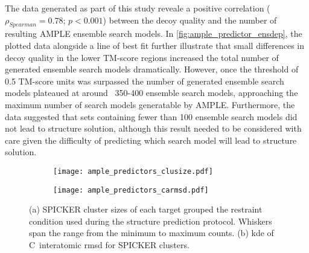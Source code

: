 The data generated as part of this study reveale a positive correlation ($\rho_{Spearman}=0.78$; $p<0.001$) between the decoy quality and the number of resulting AMPLE ensemble search models. In \cref{fig:ample_predictor_ensdep}, the plotted data alongside a line of best fit further illustrate that small differences in decoy quality in the lower TM-score regions increased the total number of generated ensemble search models dramatically. However, once the threshold of 0.5 TM-score units was surpassed the number of generated ensemble search models plateaued at around ~350-400 ensemble search models, approaching the maximum number of search models generatable by AMPLE. Furthermore, the data suggested that sets containing fewer than 100 ensemble search models did not lead to structure solution, although this result needed to be considered with care given the difficulty of predicting which search model will lead to structure solution.

\begin{figure}[H]
    \begin{subfigure}[b]{\textwidth}
        \centering
        \texttt{[image: ample\_predictors\_clusize.pdf]}
        \caption{}
        \label{fig:ample_predictor_clusize}
    \end{subfigure}

    \begin{subfigure}[b]{\textwidth}
        \centering
        \texttt{[image: ample\_predictors\_carmsd.pdf]}
        \caption{}
        \label{fig:ample_predictor_carmsd}
    \end{subfigure}
    \caption[Effects of decoy sets on SPICKER clustering]{(a) SPICKER cluster sizes of each target grouped the restraint condition used during the structure prediction protocol. Whiskers span the range from the minimum to maximum counts. (b) \Gls{kde} of C\textalpha\ interatomic \gls{rmsd} for SPICKER clusters.}
\end{figure}

